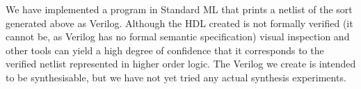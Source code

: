 We have implemented a program in Standard ML that prints a netlist of
the sort generated above as Verilog. Although the HDL created is not
formally verified (it cannot be, as Verilog has no formal semantic
specification) visual inspection and other tools can yield a high
degree of confidence that it corresponds to the verified netlist
represented in higher order logic. The Verilog we create is intended
to be synthesisable, but we have not yet tried any actual synthesis
experiments.


